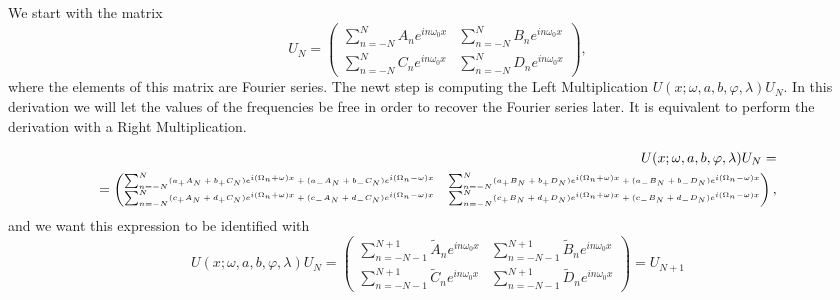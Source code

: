 \documentclass[aps,amssymb,amsmath,amsfonts,pra,superscriptaddress,onecolumn]{revtex4}
\begin{document}
We start with the matrix
\begin{equation}
    U_N = \begin{pmatrix}
    \sum_{n = -N}^N A_n e^{i n \omega_0 x} & \sum_{n = -N}^N B_n e^{i n \omega_0 x} \\
    \sum_{n = -N}^N C_n e^{i n \omega_0 x} & \sum_{n = -N}^N D_n e^{i n \omega_0 x}
    \end{pmatrix},
\end{equation}
where the elements of this matrix are Fourier series. The newt step is computing the Left Multiplication $U(x; \omega, a, b, \varphi, \lambda) U_N$. In this derivation we will let the values of the frequencies be free in order to recover the Fourier series later. It is equivalent to perform the derivation with a Right Multiplication.

\begin{equation}
\begin{split}
U(x; \omega, a, b, \varphi, \lambda) U_N = \\ = 
\begin{tiny}
\begin{pmatrix}
  \sum_{n = -N}^N (a_+ A_N + b_+ C_N) e^{i (\Omega_n + \omega) x} + (a_- A_N + b_- C_N) e^{i (\Omega_n - \omega) x} &
   \sum_{n = -N}^N (a_+ B_N + b_+ D_N) e^{i (\Omega_n + \omega) x} + (a_- B_N + b_- D_N) e^{i (\Omega_n - \omega) x} \\ 
   \sum_{n = -N}^N (c_+ A_N + d_+ C_N) e^{i (\Omega_n + \omega) x} + (c_- A_N + d_- C_N) e^{i (\Omega_n - \omega) x} &
   \sum_{n = -N}^N (c_+ B_N + d_+ D_N) e^{i (\Omega_n + \omega) x} + (c_- B_N + d_- D_N) e^{i (\Omega_n - \omega) x}
\end{pmatrix}
\end{tiny},
\end{split}
\end{equation}
and we want this expression to be identified with 
\begin{equation}
 U(x; \omega, a, b, \varphi, \lambda) U_N=
\begin{pmatrix}
    \sum_{n = -N-1}^{N + 1} \tilde{A}_n e^{i n \omega_0 x} & \sum_{n = -N-1}^{N + 1} \tilde{B}_n e^{i n \omega_0 x} \\
    \sum_{n = -N-1}^{N + 1} \tilde{C}_n e^{i n \omega_0 x} & \sum_{n = -N-1}^{N + 1} \tilde{D}_n e^{i n \omega_0 x}
    \end{pmatrix} = U_{N + 1}
\end{equation}
\end{document}
